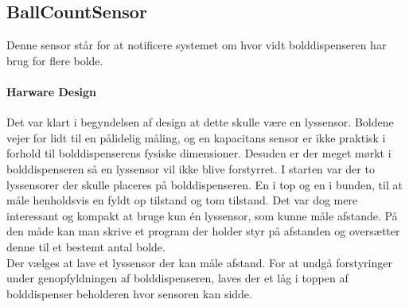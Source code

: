 
\subsection{BallCountSensor}\label{sec:BallCountSensor}
Denne sensor står for at notificere systemet om hvor vidt bolddispenseren har brug for flere bolde.

\paragraph{Harware Design}
Det var klart i begyndelsen af design at dette skulle være en lyssensor. Boldene vejer for lidt til en pålidelig måling, og en kapacitans sensor er ikke praktisk i forhold til bolddispenserens fysiske dimensioner. Desuden er der meget mørkt i bolddispenseren så en lyssensor vil ikke blive forstyrret. I starten var der to lyssensorer der skulle placeres på bolddispenseren. En i top og en i bunden, til at måle henholdsvis en fyldt op tilstand og tom tilstand. Det var dog mere interessant og kompakt at bruge kun én lyssensor, som kunne måle afstande. På den måde kan man skrive et program der holder styr på afstanden og oversætter denne til et bestemt antal bolde.\\

Der vælges at lave et lyssensor der kan måle afstand. For at undgå forstyringer under genopfyldningen af bolddispenseren, laves der et låg i toppen af bolddispenser beholderen hvor sensoren kan sidde.\\

